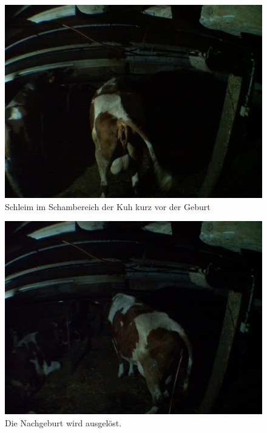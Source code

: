 \begin{figure}[h]
	\center
	\includegraphics[scale=0.075]{Grafiken/schleimvagina.jpg}
	\caption{Schleim im Schambereich der Kuh kurz vor der Geburt} 
	\label{fig: Schleim im Schambereich der Kuh kurz vor der Geburt}
\end{figure}


\begin{figure}[h]
	\center
	\includegraphics[scale=0.075]{Grafiken/schleim.jpg}
	\caption{Die Nachgeburt wird ausgelöst.} 
	\label{fig: Die Nachgeburt wird ausgelöst.}
\end{figure}